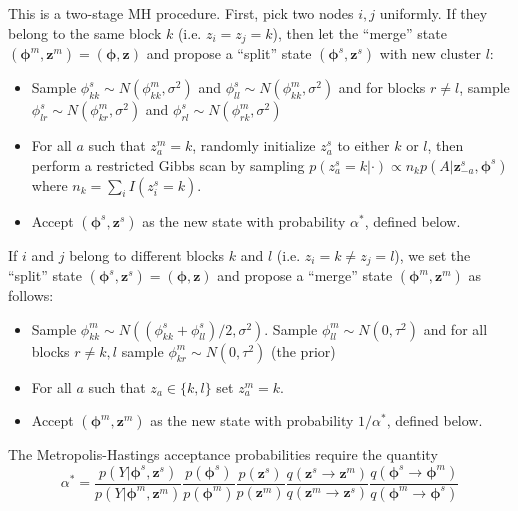 \documentclass{article}
\begin{document}

This is a two-stage MH procedure.  First, pick two nodes $i,j$ uniformly.  If they belong to the same block $k$ (i.e. $z_i=z_j=k$), then let the ``merge'' state $(\boldsymbol{\phi}^{m},\mathbf{z}^{m}) = (\boldsymbol{\phi},\mathbf{z})$ and propose a ``split'' state $(\boldsymbol{\phi}^{s},\mathbf{z}^{s})$ with new cluster $l$:
\begin{itemize}
\item Sample $\phi_{kk}^{s} \sim N(\phi_{kk}^{m},\sigma^2)$ and $\phi_{ll}^{s} \sim N(\phi_{kk}^{m},\sigma^2)$ and for blocks $r \ne l$, sample $\phi_{lr}^{s} \sim N(\phi_{kr}^{m},\sigma^2)$ and $\phi_{rl}^{s} \sim N(\phi_{rk}^{m},\sigma^2)$ 
\item For all $a$ such that $z_a^{m} = k$, randomly initialize $z_a^{s}$ to either $k$ or $l$, then perform a restricted Gibbs scan by sampling $p(z_{a}^{s}=k|\cdot)  \propto n_k p(A|\mathbf{z}^{s}_{-a},\boldsymbol{\phi}^{s})$
where $n_k=\sum_{i}I(z_i^{s}=k)$.%
\item Accept  $(\boldsymbol{\phi}^{s},\mathbf{z}^{s})$ as the new state with probability $\alpha^*$, defined below.
\end{itemize}

 If $i$ and $j$ belong to different blocks $k$ and $l$ (i.e. $z_i = k \ne z_j=l$), we set the ``split'' state  $(\boldsymbol{\phi}^{s},\mathbf{z}^{s}) = (\boldsymbol{\phi},\mathbf{z})$ and propose a ``merge'' state $(\boldsymbol{\phi}^{m},\mathbf{z}^{m})$ as follows:
\begin{itemize}
\item Sample $\phi_{kk}^m \sim N((\phi_{kk}^s + \phi_{ll}^s)/2,
  \sigma^2)$.  Sample $\phi_{ll}^m \sim N(0,\tau^2)$ and for all blocks $r \ne k,l$ sample $\phi_{kr}^{m} \sim N(0,\tau^2)$ (the prior)
\item For all $a$ such that $z_a \in \{k,l\}$ set $z_a^m = k$.
\item Accept $(\boldsymbol{\phi}^{m},\mathbf{z}^{m})$ as the new state with probability $1/\alpha^*$, defined below.
\end{itemize}

 The Metropolis-Hastings acceptance probabilities require the quantity
$$\alpha^* =\frac{p(Y|\boldsymbol{\phi}^{s},\mathbf{z}^{s})}{p(Y|\boldsymbol{\phi}^{m},\mathbf{z}^{m})}  \frac{p(\boldsymbol{\phi}^{s})}{p(\boldsymbol{\phi}^{m})} \frac{p(\mathbf{z}^{s})}{p(\mathbf{z}^{m})} \frac{q(\mathbf{z}^{s} \rightarrow \mathbf{z}^{m})}{q( \mathbf{z}^{m} \rightarrow \mathbf{z}^{s})} \frac{q(\boldsymbol{\phi}^{s} \rightarrow \boldsymbol{\phi}^{m})}{q(\boldsymbol{\phi}^{m} \rightarrow \boldsymbol{\phi}^{s})}$$
\end{document}
